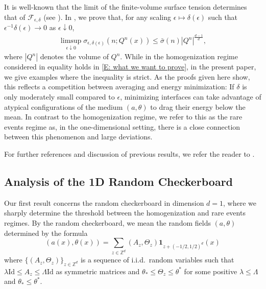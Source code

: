 \documentclass[10pt,a4paper]{amsart}
\begin{document}
It is well-known that the limit of the finite-volume surface tension determines that of $\mathscr{F}_{\epsilon,\delta}$ (see \cite{ansini_braides_chiado-piat,morfe}).  In \cite[Theorem 2]{part1}, we prove that, for any scaling $\epsilon \mapsto \delta(\epsilon)$ such that $\epsilon^{-1} \delta(\epsilon) \to 0$ as $\epsilon \downarrow 0$, 
	\begin{align} \label{E: what we want to prove}
		\limsup_{\epsilon \downarrow 0} \sigma_{\epsilon,\delta(\epsilon)} ( n ; Q^{n}(x) ) \leq \bar{\sigma}(n) | Q^{n} |^{ \frac{ d - 1 }{ d } } ,
	\end{align} 
where $ | Q^{n} |$ denotes the volume of $Q^{n}$.  While in the homogenization regime considered in \cite{part1} equality holds in \eqref{E: what we want to prove}, in the present paper, we give examples where the inequality is strict.  As the proofs given here show, this reflects a competition between averaging and energy minimization: If $\delta$ is only moderately small compared to $\epsilon$, minimizing interfaces can take advantage of atypical configurations of the medium $(a,\theta)$ to drag their energy below the mean.  In contrast to the homogenization regime, we refer to this as the rare events regime as, in the one-dimensional setting, there is a close connection between this phenomenon and large deviations.

For further references and discussion of previous results, we refer the reader to \cite{part1}.

\subsection{Analysis of the 1D Random Checkerboard} Our first result concerns the random checkerboard in dimension $d = 1$, where we sharply determine the threshold between the homogenization and rare events regimes.  By the random checkerboard, we mean the random fields $(a,\theta)$ determined by the formula
	\begin{equation} \label{E: one d random checkerboard}
		(a(x),\theta(x)) = \sum_{z \in \mathbb{Z}^{d}} (A_{z},\Theta_{z}) \boldsymbol{1}_{ z + (-1/2,1/2)^{d} }(x)
	\end{equation}  
where $\{ (A_{z},\Theta_{z} ) \}_{z \in \mathbb{Z}^{d}}$ is a sequence of i.i.d.\ random variables such that $\lambda \text{Id} \leq A_{z} \leq \Lambda \text{Id}$ as symmetric matrices and $\theta_{*} \leq \Theta_{z} \leq \theta^{*}$ for some positive $\lambda \leq \Lambda$ and $ \theta_{*} \leq \theta^{*}$.
\end{document}
